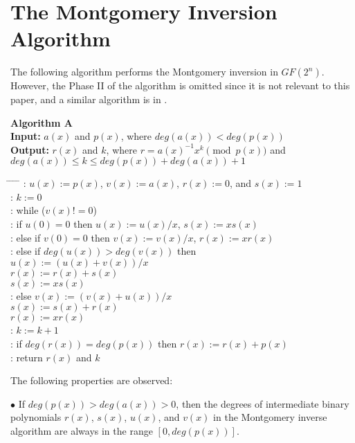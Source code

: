 \documentclass[twocolumn]{IEEEtran}
\begin{document}
\section {The Montgomery Inversion Algorithm}

The following algorithm performs the Montgomery inversion in $GF(2^n)$.
However, the Phase II of the algorithm is omitted since it is not
relevant to this paper, and a similar algorithm is in \cite{SK00:The}.

\noindent \textbf{Algorithm A} \\
\textbf{Input:} $a(x)$ and $p(x)$, where $deg(a(x)) < deg(p(x))$ \\
\textbf{Output:} $r(x)$ and $k$, where $r=a(x)^{-1} x^k \pmod{p(x)}$  
and $deg(a(x)) \leq k \leq deg(p(x))+deg(a(x))+1$

\begin{tabbing}
\hspace*{0cm} \= \hspace{0.5cm} \= \hspace{1ex} \= \hspace{1ex} \= \kill
{}:  \> $u(x) := p(x)$, $v(x) := a(x)$, $r(x) := 0$, and $s(x) := 1$\\
:  \> $k:=0$\\
:  \> while ($v(x) != 0$) \\
:  \> \> if $u(0) = 0$ then $u(x) := u(x)/x$, $s(x) := xs(x)$ \\
:  \> \> else if $v(0)=0$ then $v(x) := v(x)/x$, $r(x) := xr(x)$ \\
:  \> \> else if $deg(u(x)) > deg(v(x))$ then \\
\>	\>  \> \> $u(x):= (u(x)+v(x))/x$ \\
\> \>  \> \> $r(x) := r(x) + s(x)$ \\
\> \>  \> \> $s(x) := xs(x)$ \\
:  \> \> else $v(x) := (v(x)+u(x))/x$ \\
\> \>  \> \> $s(x) := s(x)+r(x)$ \\
\> \>  \> \> $r(x) := xr(x)$ \\
:  \> \> $k:=k+1$\\
:  \> if $deg(r(x)) = deg(p(x))$ then $r(x) := r(x)+p(x)$ \\
: \> return $r(x)$ and $k$
\end{tabbing}
The following properties are observed: 

\noindent $\bullet$ 
If $deg(p(x))>deg(a(x))>0$, then the degrees of intermediate binary polynomials
$r(x)$, $s(x)$, $u(x)$, and $v(x)$ in the
Montgomery inverse algorithm are always in the range $[0, deg(p(x))]$.
\end{document}
